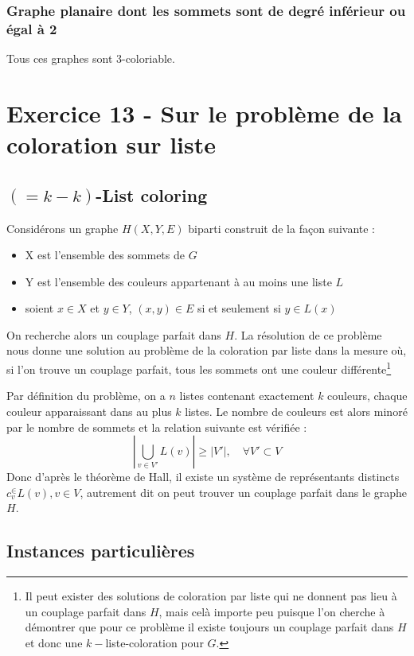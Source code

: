 \subsubsection{Graphe planaire dont les sommets sont de degré inférieur ou égal à 2}

Tous ces graphes sont 3-coloriable.

\section{Exercice 13 - Sur le problème de la coloration sur liste}

\subsection{$(=k-k)$-List coloring}

Considérons un graphe $H(X,Y,E)$ biparti construit de la façon suivante :
\begin{itemize}
	\item X est l'ensemble des sommets de $G$
	\item Y est l'ensemble des couleurs appartenant à au moins une liste $L$
	\item soient $x \in X$ et $y \in Y$, $(x,y) \in E$ si et seulement si $y \in L(x)$
\end{itemize}

On recherche alors un couplage parfait dans $H$. La résolution de ce problème nous donne une
solution au problème de la coloration par liste dans la mesure où, si l'on trouve un couplage
parfait, tous les sommets ont une couleur différente\footnote{Il peut exister des solutions de
coloration par liste qui ne donnent pas lieu à un couplage parfait dans $H$, mais celà importe peu
puisque l'on cherche à démontrer que pour ce problème il existe toujours un couplage parfait dans
$H$ et donc une $k-$liste-coloration pour $G$.}

Par définition du problème, on a $n$ listes contenant exactement $k$ couleurs, chaque couleur
apparaissant dans au plus $k$ listes. Le nombre de couleurs est alors minoré par le nombre de
sommets et la relation suivante est vérifiée : $$
|\bigcup_{v \in V'} L(v)| \geq |V'|, \quad \forall V' \subset V $$
Donc d'après le théorème de Hall, il existe un système de représentants distincts $c_v^\in L(v), v
\in V$, autrement dit on peut trouver un couplage parfait dans le graphe $H$.

\subsection{Instances particulières}

